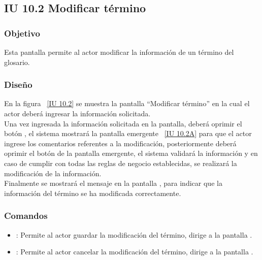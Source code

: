 \newpage 
\subsection{IU 10.2 Modificar término}

\subsubsection{Objetivo}
	
	Esta pantalla permite al actor modificar la información de un término del glosario.

\subsubsection{Diseño}

    En la figura ~\ref{IU 10.2} se muestra la pantalla ``Modificar término'' en la cual el actor deberá ingresar la información solicitada. \\
    
    Una vez ingresada la información solicitada en la pantalla, deberá oprimir el botón , el sistema mostrará la pantalla emergente ~\ref{IU 10.2A} 
    para que el actor ingrese los comentarios referentes a la modificación, posteriormente deberá oprimir el botón  de la pantalla emergente, 
    el sistema validará la información y en caso de cumplir con todas las reglas de negocio establecidas, se realizará la modificación de la información.\\
    
    Finalmente se mostrará el mensaje  en la pantalla , para indicar que la información del término se ha modificada correctamente.        



\subsubsection{Comandos}
\begin{itemize}
	\item {}: Permite al actor guardar la modificación del término, dirige a la pantalla .
	\item {}: Permite al actor cancelar la modificación del término, dirige a la pantalla .
\end{itemize}

